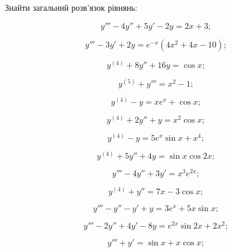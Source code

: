 Знайти загальний розв'язок рівнянь:

\begin{multicols}{2}
    \begin{problem}
    	\[y'''-4y''+5y'-2y=2x+3;\]
    \end{problem}
 
    \begin{problem}
    	\[y'''-3y'+2y=e^{-x}(4x^2+4x-10);\]
    \end{problem}
 
    \begin{problem}
    	\[y^{(4)}+8y''+16y=\cos x;\]
    \end{problem}
 
    \begin{problem}
    	\[y^{(5)}+y'''=x^2-1;\]
    \end{problem}
 
    \begin{problem}
    	\[y^{(4)}-y=xe^x+\cos x;\]
    \end{problem}
 
    \begin{problem}
    	\[y^{(4)}+2y''+y=x^2\cos x;\]
    \end{problem}
 
    \begin{problem}
    	\[y^{(4)}-y=5e^x\sin x+x^4;\]
    \end{problem}
 
    \begin{problem}
    	\[y^{(4)}+5y''+4y=\sin x\cos 2x;\]
    \end{problem}
 
    \begin{problem}
    	\[y'''-4y''+3y'=x^3 e^{2x};\]
    \end{problem}
 
    \begin{problem}
    	\[y^{(4)}+y''=7x-3\cos x;\]
    \end{problem}
 
    \begin{problem}
    	\[y'''-y''-y'+y=3e^x+5x\sin x;\]
    \end{problem}
 
    \begin{problem}
    	\[y'''-2y''+4y'-8y=e^{2x}\sin 2x+2x^2;\]
    \end{problem}
 
    \begin{problem}
    	\[y'''+y'=\sin x+x\cos x;\]
    \end{problem}
 

\end{multicols}
